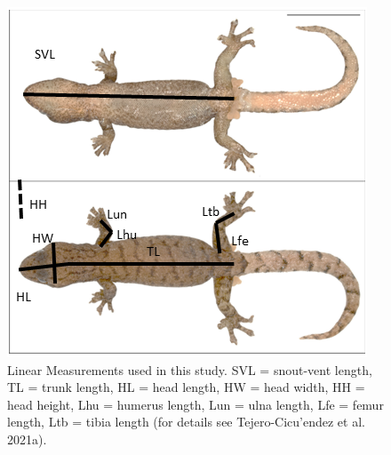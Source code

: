 \documentclass[
]{article}
\begin{document}
\newpage

\begin{figure}

{\centering \includegraphics[width=1\linewidth]{Figs/Fig1} 

}

\caption{Linear Measurements used in this study. SVL = snout-vent length, TL = trunk length, HL = head length, HW = head width, HH = head height, Lhu = humerus length, Lun = ulna length, Lfe = femur length, Ltb = tibia length (for details see Tejero-Cicu{'{e}}ndez et al. 2021a).}\label{fig:unnamed-chunk-3}
\end{figure}

\newpage
\end{document}
